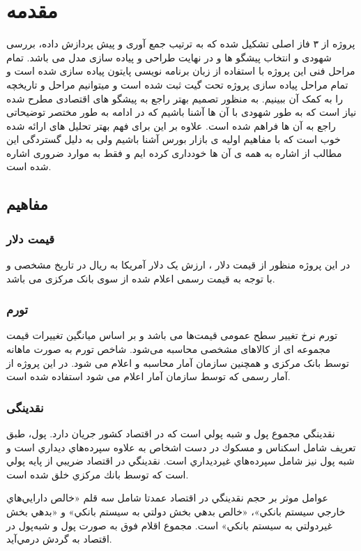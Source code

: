 \documentclass[12pt]{report}
\begin{document}
\tableofcontents


\chapter{مقدمه}

\pagestyle{plain}
\setcounter{page}{1}
پروژه از ۳ فاز اصلی تشکیل شده که به ترتیب جمع آوری و پیش پردازش داده، بررسی شهودی و انتخاب پیشگو ها و در نهایت طراحی و پیاده سازی مدل می باشد.
تمام مراحل فنی این پروژه با استفاده از
زبان برنامه نویسی پایتون
 پیاده سازی شده است و تمام مراحل پیاده سازی پروژه تحت
 گیت
ثبت شده است و میتوانیم مراحل و تاریخچه را به کمک آن ببینیم.
به منظور تصمیم بهتر راجع به
پیشگو
های اقتصادی مطرح شده نیاز است که به طور شهودی با آن ها آشنا باشیم که در ادامه به طور مختصر توضیحاتی راجع به آن ها فراهم شده است.
علاوه بر این برای فهم بهتر تحلیل های ارائه شده خوب است که با مفاهیم اولیه ی بازار بورس آشنا باشیم ولی به دلیل گستردگی این مطالب از اشاره به همه ی آن ها خودداری کرده ایم و فقط به موارد ضروری اشاره شده است.

\section{مفاهیم}
\subsection{قیمت دلار}
در این پروژه منظور از قیمت دلار ، ارزش یک دلار آمریکا به ریال در تاریخ مشخصی و با توجه به قیمت رسمی اعلام شده از سوی بانک مرکزی می باشد.
\subsection{تورم}
تورم
 نرخ تغییر سطح عمومی قیمت‌ها می باشد و بر اساس میانگین تغییرات قیمت مجموعه ای از کالاهای مشخصی محاسبه می‌شود. شاخص تورم به صورت ماهانه توسط بانک مرکزی و همچنین سازمان آمار محاسبه و اعلام می شود.
در این پروژه از آمار رسمی که توسط سازمان آمار اعلام می شود استفاده شده است.
\subsection{نقدینگی}
نقدينگي
مجموع پول و شبه پولي است كه در اقتصاد كشور جريان دارد. پول، طبق تعريف شامل اسكناس و مسكوك در دست اشخاص به علاوه سپرده‌هاي ديداري است و شبه پول نيز شامل سپرده‌هاي غيرديداري است. نقدينگي در اقتصاد ضريبي از پايه پولي است كه توسط بانك مركزي خلق شده است.
\par
عوامل موثر بر حجم نقدينگي در اقتصاد عمدتا شامل سه قلم «خالص دارايي‌هاي خارجي سيستم بانكي»، «خالص بدهي بخش دولتي به سيستم بانكي» و «بدهي بخش غيردولتي به سيستم بانكي» است. مجموع اقلام فوق به صورت پول و شبه‌پول در اقتصاد به گردش درمي‌آيد.
\end{document}
